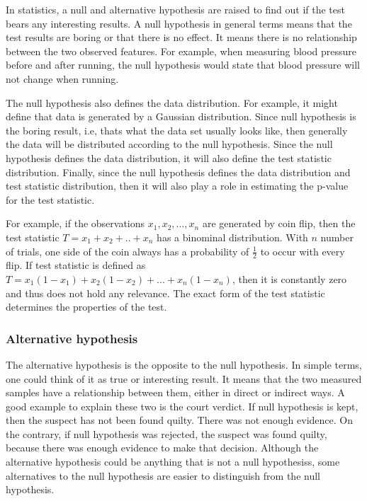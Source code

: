 \documentclass[12pt]{article}
\begin{document}
In statistics, a null and alternative hypothesis are raised to find out if the test bears any interesting results. A null hypothesis in general terms means that the test results are boring or that there is no effect. It means there is no relationship between the two observed features. For example, when measuring blood pressure before and after running, the null hypothesis would state that blood pressure will not change when running.

The null hypothesis also defines the data distribution. For example, it might define that data is generated by a Gaussian distribution. Since null hypothesis is the boring result, i.e, thats what the data set usually looks like, then generally the data will be distributed according to the null hypothesis. Since the null hypothesis defines the data distribution, it will also define the test statistic distribution. Finally, since the null hypothesis defines the data distribution and test statistic distribution, then it will also play a role in estimating the p-value for the test statistic.

For example, if the observations $x_1, x_2, ..., x_n$ are generated by coin flip, then the test statistic $T=x_1 + x_2 + .. + x_n$ has a binominal distribution. With $n$ number of trials, one side of the coin always has a probability of $\frac{1}{2}$ to occur with every flip. If test statistic is defined as $T=x_1(1-x_1) + x_2(1-x_2) + ... + x_n(1-x_n)$, then it is constantly zero and thus does not hold any relevance. The exact form of the test statistic determines the properties of the test.

\subsubsection{Alternative hypothesis}
The alternative hypothesis is the opposite to the null hypothesis. In simple terms, one could think of it as true or interesting result. It means that the two measured samples have a relationship between them, either in direct or indirect ways. A good example to explain these two is the court verdict. If null hypothesis is kept, then the suspect has not been found quilty. There was not enough evidence. On the contrary, if null hypothesis was rejected, the suspect was found quilty, because there was enough evidence to make that decision. Although the alternative hypothesis could be anything that is not a null hypothesiss, some alternatives to the null hypothesis are easier to distinguish from the null hypothesis.
\end{document}
